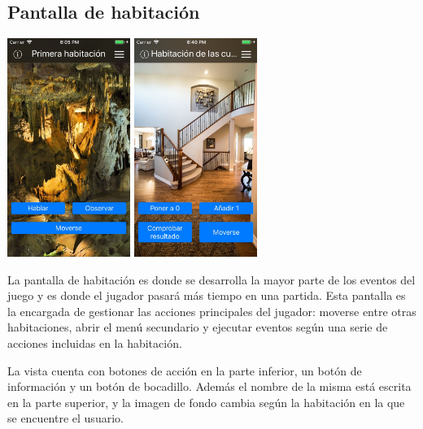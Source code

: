 \subsection{Pantalla de habitación}
\begin{center}
	\includegraphics[width=0.3\textwidth]{include/snapshots/roomView.jpg}
	\includegraphics[width=0.3\textwidth]{include/snapshots/secondRoomView.jpg}
\end{center}

La pantalla de habitación es donde se desarrolla la mayor parte de los eventos del juego y es donde el jugador pasará más tiempo en una partida.
Esta pantalla es la encargada de gestionar las acciones principales del jugador: moverse entre otras habitaciones, abrir el menú secundario y ejecutar eventos según una serie de acciones incluidas en la habitación.

La vista cuenta con botones de acción en la parte inferior, un botón de información y un botón de bocadillo. Además el nombre de la misma está escrita en la parte superior, y la imagen de fondo cambia según la habitación en la que se encuentre el usuario.

